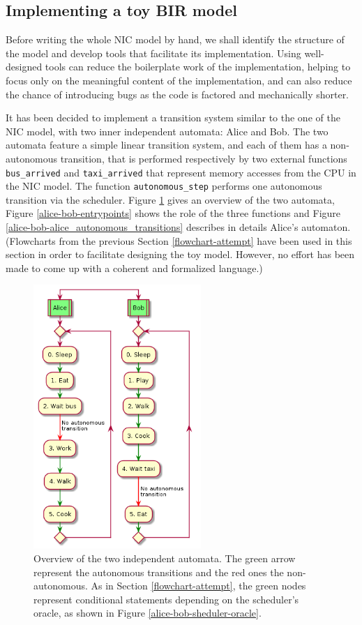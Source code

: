 \documentclass{kththesis}
\begin{document}
{\subsection{Implementing a toy BIR model} \label{alice-bob-toy}

Before writing the whole NIC model by hand, we shall identify the structure of the model and develop tools that facilitate its implementation. Using well-designed tools can reduce the boilerplate work of the implementation, helping to focus only on the meaningful content of the implementation, and can also reduce the chance of introducing bugs as the code is factored and mechanically shorter.

It has been decided to implement a transition system similar to the one of the NIC model, with two inner independent automata: Alice and Bob. The two automata feature a simple linear transition system, and each of them has a non-autonomous transition, that is performed respectively by two external functions \texttt{bus\_arrived} and \texttt{taxi\_arrived} that represent memory accesses from the CPU in the NIC model. The function \texttt{autonomous\_step} performs one autonomous transition via the scheduler. Figure \ref{alice-bob-automata-overview} gives an overview of the two automata, Figure \ref{alice-bob-entrypoints} shows the role of the three functions and Figure \ref{alice-bob-alice_autonomous_transitions} describes in details Alice's automaton. (Flowcharts from the previous Section \ref{flowchart-attempt} have been used in this section in order to facilitate designing the toy model. However, no effort has been made to come up with a coherent and formalized language.)

\begin{figure}[p]
	\includegraphics[height=10cm]{figures/alice-bob-automata-overview.png}
	\centering
	\caption{Overview of the two independent automata. The green arrow represent the autonomous transitions and the red ones the non-autonomous. As in Section \ref{flowchart-attempt}, the green nodes represent conditional statements depending on the scheduler's oracle, as shown in Figure \ref{alice-bob-sheduler-oracle}.}
	\label{alice-bob-automata-overview}
\end{figure}

}
\end{document}
